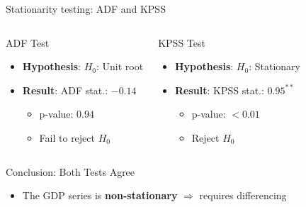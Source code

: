 \documentclass[9pt, aspectratio=169, t]{beamer}
\begin{document}
\begin{frame}{Stationarity testing: ADF and KPSS}
    \begin{columns}[T]
        \begin{block}{ADF Test}
            \begin{itemize}\setlength{\itemsep}{0pt}
                \item \textbf{Hypothesis}: $H_0$: Unit root
                \item \textbf{Result}: ADF stat.: $-0.14$
                \begin{itemize}
                    \item p-value: $0.94$
                    \item Fail to reject $H_0$
                \end{itemize}
            \end{itemize}
        \end{block}
        \begin{exampleblock}{KPSS Test}
            \begin{itemize}\setlength{\itemsep}{0pt}
                \item \textbf{Hypothesis}: $H_0$: Stationary
                \item \textbf{Result}: KPSS stat.: $0.95^{**}$
                \begin{itemize}
                    \item p-value: $< 0.01$
                    \item Reject $H_0$
                \end{itemize}
            \end{itemize}
        \end{exampleblock}
    \end{columns}
    \vspace{0.2cm}
    \begin{alertblock}{Conclusion: Both Tests Agree}
        \begin{itemize}\setlength{\itemsep}{0pt}
            \item The GDP series is \textbf{non-stationary} $\Rightarrow$ requires differencing
        \end{itemize}
    \end{alertblock}
\end{frame}
\end{document}
